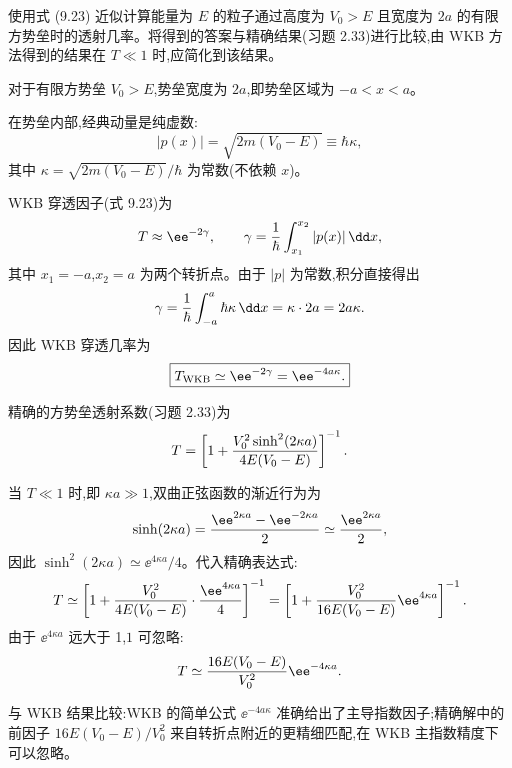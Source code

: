 \begin{question}
使用式 (9.23) 近似计算能量为 $E$ 的粒子通过高度为 $V_0>E$ 且宽度为 $2a$ 的有限方势垒时的透射几率。将得到的答案与精确结果(习题 2.33)进行比较,由 WKB 方法得到的结果在 $T\ll1$ 时,应简化到该结果。

\par\smallskip
{}

\end{question}
\begin{solution}
对于有限方势垒 $V_0>E$,势垒宽度为 $2a$,即势垒区域为 $-a<x<a$。

在势垒内部,经典动量是纯虚数:
\[
|p(x)|=\sqrt{2m(V_0-E)}\equiv\hbar\kappa,
\]
其中 $\kappa=\sqrt{2m(V_0-E)}/\hbar$ 为常数(不依赖 $x$)。

WKB 穿透因子(式 9.23)为
\[
T\approx \ee^{-2\gamma},
\qquad
\gamma={1\over\hbar}\int_{x_1}^{x_2}|p(x)|\,\dd x,
\]
其中 $x_1=-a$,$x_2=a$ 为两个转折点。由于 $|p|$ 为常数,积分直接得出
\[
\gamma={1\over\hbar}\int_{-a}^{a}\hbar\kappa\,\dd x
=\kappa\cdot 2a=2a\kappa.
\]
因此 WKB 穿透几率为
\[
\boxed{T_{\rm WKB}\simeq \ee^{-2\gamma}=\ee^{-4a\kappa}.}
\]

精确的方势垒透射系数(习题 2.33)为
\[
T=\left[1+{V_0^2\sinh^2(2\kappa a)\over4E(V_0-E)}\right]^{-1}.
\]

当 $T\ll1$ 时,即 $\kappa a\gg1$,双曲正弦函数的渐近行为为
\[
\sinh(2\kappa a)={\ee^{2\kappa a}-\ee^{-2\kappa a}\over2}
\simeq {\ee^{2\kappa a}\over2},
\]
因此 $\sinh^2(2\kappa a)\simeq \ee^{4\kappa a}/4$。代入精确表达式:
\[
T\simeq\left[1+{V_0^2\over4E(V_0-E)}\cdot{\ee^{4\kappa a}\over4}\right]^{-1}
=\left[1+{V_0^2\over16E(V_0-E)}\ee^{4\kappa a}\right]^{-1}.
\]
由于 $\ee^{4\kappa a}$ 远大于 1,$1$ 可忽略:
\[
T\simeq{16E(V_0-E)\over V_0^2}\ee^{-4\kappa a}.
\]

与 WKB 结果比较:WKB 的简单公式 $\ee^{-4a\kappa}$ 准确给出了主导指数因子;精确解中的前因子 $16E(V_0-E)/V_0^2$ 来自转折点附近的更精细匹配,在 WKB 主指数精度下可以忽略。
\end{solution}

